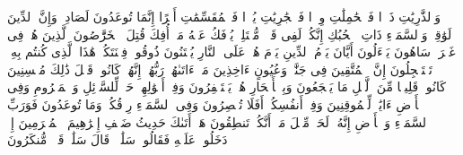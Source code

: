 \stopbuffer
\startbuffer[\q:51:1]
وَٱلذَّٰرِیَٰتِ ذَرۡوࣰا%
\stopbuffer
\startbuffer[\q:51:2]
فَٱلۡحَٰمِلَٰتِ وِقۡرࣰا%
\stopbuffer
\startbuffer[\q:51:3]
فَٱلۡجَٰرِیَٰتِ یُسۡرࣰا%
\stopbuffer
\startbuffer[\q:51:4]
فَٱلۡمُقَسِّمَٰتِ أَمۡرًا%
\stopbuffer
\startbuffer[\q:51:5]
إِنَّمَا تُوعَدُونَ لَصَادِقࣱ%
\stopbuffer
\startbuffer[\q:51:6]
وَإِنَّ ٱلدِّینَ لَوَٰقِعࣱ%
\stopbuffer
\startbuffer[\q:51:7]
وَٱلسَّمَاۤءِ ذَاتِ ٱلۡحُبُكِ%
\stopbuffer
\startbuffer[\q:51:8]
إِنَّكُمۡ لَفِی قَوۡلࣲ مُّخۡتَلِفࣲ%
\stopbuffer
\startbuffer[\q:51:9]
یُؤۡفَكُ عَنۡهُ مَنۡ أُفِكَ%
\stopbuffer
\startbuffer[\q:51:10]
قُتِلَ ٱلۡخَرَّٰصُونَ%
\stopbuffer
\startbuffer[\q:51:11]
ٱلَّذِینَ هُمۡ فِی غَمۡرَةࣲ سَاهُونَ%
\stopbuffer
\startbuffer[\q:51:12]
یَسۡءَلُونَ أَیَّانَ یَوۡمُ ٱلدِّینِ%
\stopbuffer
\startbuffer[\q:51:13]
یَوۡمَ هُمۡ عَلَى ٱلنَّارِ یُفۡتَنُونَ%
\stopbuffer
\startbuffer[\q:51:14]
ذُوقُوا۟ فِتۡنَتَكُمۡ هَٰذَا ٱلَّذِی كُنتُم بِهِۦ تَسۡتَعۡجِلُونَ%
\stopbuffer
\startbuffer[\q:51:15]
إِنَّ ٱلۡمُتَّقِینَ فِی جَنَّٰتࣲ وَعُیُونٍ%
\stopbuffer
\startbuffer[\q:51:16]
ءَاخِذِینَ مَاۤ ءَاتَىٰهُمۡ رَبُّهُمۡۚ إِنَّهُمۡ كَانُوا۟ قَبۡلَ ذَٰلِكَ مُحۡسِنِینَ%
\stopbuffer
\startbuffer[\q:51:17]
كَانُوا۟ قَلِیلࣰا مِّنَ ٱلَّیۡلِ مَا یَهۡجَعُونَ%
\stopbuffer
\startbuffer[\q:51:18]
وَبِٱلۡأَسۡحَارِ هُمۡ یَسۡتَغۡفِرُونَ%
\stopbuffer
\startbuffer[\q:51:19]
وَفِیۤ أَمۡوَٰلِهِمۡ حَقࣱّ لِّلسَّاۤئِلِ وَٱلۡمَحۡرُومِ%
\stopbuffer
\startbuffer[\q:51:20]
وَفِی ٱلۡأَرۡضِ ءَایَٰتࣱ لِّلۡمُوقِنِینَ%
\stopbuffer
\startbuffer[\q:51:21]
وَفِیۤ أَنفُسِكُمۡۚ أَفَلَا تُبۡصِرُونَ%
\stopbuffer
\startbuffer[\q:51:22]
وَفِی ٱلسَّمَاۤءِ رِزۡقُكُمۡ وَمَا تُوعَدُونَ%
\stopbuffer
\startbuffer[\q:51:23]
فَوَرَبِّ ٱلسَّمَاۤءِ وَٱلۡأَرۡضِ إِنَّهُۥ لَحَقࣱّ مِّثۡلَ مَاۤ أَنَّكُمۡ تَنطِقُونَ%
\stopbuffer
\startbuffer[\q:51:24]
هَلۡ أَتَىٰكَ حَدِیثُ ضَیۡفِ إِبۡرَٰهِیمَ ٱلۡمُكۡرَمِینَ%
\stopbuffer
\startbuffer[\q:51:25]
إِذۡ دَخَلُوا۟ عَلَیۡهِ فَقَالُوا۟ سَلَٰمࣰاۖ قَالَ سَلَٰمࣱ قَوۡمࣱ مُّنكَرُونَ%
\stopbuffer
